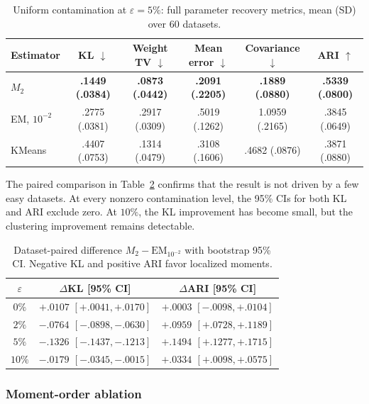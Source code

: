 \documentclass[11pt,a4paper]{article}
\newcommand{\best}[1]{\textbf{#1}}
\newcommand{\Mtwo}{M_2}
\newcommand{\EM}{\mathrm{EM}}
\begin{document}
\begin{table}[ht]
\centering
\scriptsize
\caption{Uniform contamination at $\varepsilon=5\%$: full parameter recovery
metrics, mean (SD) over 60 datasets.}
\label{tab:uniform_full}
\begin{tabular}{@{}l c c c c c@{}}
\toprule
Estimator & KL $\downarrow$ & Weight TV $\downarrow$ & Mean error $\downarrow$
 & Covariance $\downarrow$ & ARI $\uparrow$ \\
\midrule
$\Mtwo$ & \best{.1449 (.0384)} & \best{.0873 (.0442)}
 & \best{.2091 (.2205)} & \best{.1889 (.0880)} & \best{.5339 (.0800)} \\
EM, $10^{-2}$ & .2775 (.0381) & .2917 (.0309)
 & .5019 (.1262) & 1.0959 (.2165) & .3845 (.0649) \\
KMeans & .4407 (.0753) & .1314 (.0479)
 & .3108 (.1606) & .4682 (.0876) & .3871 (.0880) \\
\bottomrule
\end{tabular}
\end{table}

The paired comparison in Table~\ref{tab:uniform_ci} confirms that the result
is not driven by a few easy datasets.  At every nonzero contamination level,
the 95\% CIs for both KL and ARI exclude zero.  At $10\%$, the KL improvement
has become small, but the clustering improvement remains detectable.

\begin{table}[ht]
\centering
\small
\caption{Dataset-paired difference $\Mtwo-\EM_{10^{-2}}$ with bootstrap 95\%
CI.  Negative KL and positive ARI favor localized moments.}
\label{tab:uniform_ci}
\begin{tabular}{@{}c c c@{}}
\toprule
$\varepsilon$ & $\Delta$KL [95\% CI] & $\Delta$ARI [95\% CI] \\
\midrule
$0\%$  & $+.0107$ $[+.0041,+.0170]$ & $+.0003$ $[-.0098,+.0104]$ \\
$2\%$  & \best{$-.0764$ $[-.0898,-.0630]$} & \best{$+.0959$ $[+.0728,+.1189]$} \\
$5\%$  & \best{$-.1326$ $[-.1437,-.1213]$} & \best{$+.1494$ $[+.1277,+.1715]$} \\
$10\%$ & \best{$-.0179$ $[-.0345,-.0015]$} & \best{$+.0334$ $[+.0098,+.0575]$} \\
\bottomrule
\end{tabular}
\end{table}

\subsubsection{Moment-order ablation}
\end{document}
